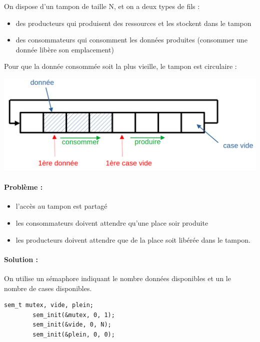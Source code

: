 \begin{appl} \normalfont
	On dispose d'un tampon de taille N, et on a deux types de fils : \begin{itemize}
		\item des producteurs qui produisent des ressources et les stockent dans le tampon
		\item des consommateurs qui consomment les données produites (consommer une donnée libère son emplacement)
	\end{itemize}
	
	Pour que la donnée consommée soit la plus vieille, le tampon est circulaire :
	\begin{center}
		\includegraphics[width=0.7\linewidth]{lecon/18-fil/prod-cons.png}
	\end{center}
	
	\paragraph{Problème :} \begin{itemize}
		\item l'accès au tampon est partagé
		\item les consommateurs doivent attendre qu'une place soir produite
		\item les producteurs doivent attendre que de la place soit libérée dans le tampon.
	\end{itemize}
	
	\paragraph{Solution :} On utilise un sémaphore indiquant le nombre données disponibles et un le nombre de cases disponibles.
	
	\begin{lstlisting}[style=CStyle]
		sem_t mutex, vide, plein;
		sem_init(&mutex, 0, 1);
		sem_init(&vide, 0, N);
		sem_init(&plein, 0, 0);\end{lstlisting}
	

\end{appl}

